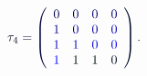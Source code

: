 \documentclass[12pt]{article}
\begin{document}
\makeatletter
\renewcommand*{\@textcolor}[3]{%
  \protect\leavevmode
  \begingroup
    \color#1{#2}#3%
  \endgroup
}
\makeatother
\begin{displaymath}
\mathcolor[RGB]{0,0,15}{\tau} _ { \mathcolor[RGB]{0,0,30}{4} } \mathcolor[RGB]{0,0,45}{=} \mathcolor[RGB]{0,0,60}{\left(} \begin{array} {cccc} { \mathcolor[RGB]{0,0,75}{0} } & { \mathcolor[RGB]{0,0,90}{0} } & { \mathcolor[RGB]{0,0,105}{0} } & { \mathcolor[RGB]{0,0,120}{0} } \\ { \mathcolor[RGB]{0,0,135}{1} } & { \mathcolor[RGB]{0,0,150}{0} } & { \mathcolor[RGB]{0,0,165}{0} } & { \mathcolor[RGB]{0,0,180}{0} } \\ { \mathcolor[RGB]{0,0,195}{1} } & { \mathcolor[RGB]{0,0,210}{1} } & { \mathcolor[RGB]{0,0,225}{0} } & { \mathcolor[RGB]{0,0,240}{0} } \\ { \mathcolor[RGB]{0,0,255}{1} } & { \mathcolor[RGB]{0,15,0}{1} } & { \mathcolor[RGB]{0,15,15}{1} } & { \mathcolor[RGB]{0,15,30}{0} } \end{array} \mathcolor[RGB]{0,15,45}{\right)} \mathcolor[RGB]{0,15,60}{.}
\end{displaymath}
\end{document}
